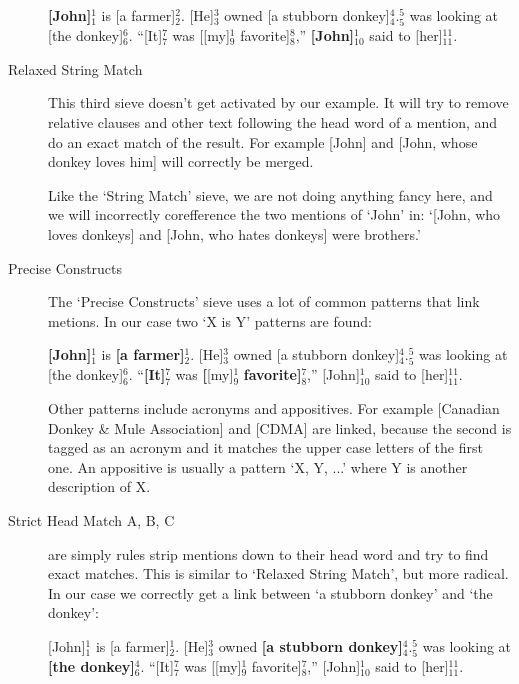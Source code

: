 \documentclass[12pt]{article}
\begin{document}
\begin{description}
\textbf{[John]$_1^1$} is [a farmer]$_2^2$. [He]$_3^3$ owned [a stubborn donkey]$_4^4$.\newline
[A girl]$_5^5$ was looking at [the donkey]$_6^6$.\newline
``[It]$_7^7$ was [[my]$_9^1$ favorite]$_8^8$,'' \textbf{[John]$_{10}^{1}$} said to [her]$_{11}^{11}$.
\item[Relaxed String Match]
This third sieve doesn't get activated by our example. It will try to remove relative clauses and other text following the head word of a mention, and do an exact match of the result. For example [John] and [John, whose donkey loves him] will correctly be merged.

Like the `String Match' sieve, we are not doing anything fancy here, and we will incorrectly corefference the two mentions of `John' in: `[John, who loves donkeys] and [John, who hates donkeys] were brothers.'
\item[Precise Constructs]
The `Precise Constructs' sieve uses a lot of common patterns that link metions. In our case two `X is Y' patterns are found:

\textbf{[John]$_1^1$} is \textbf{[a farmer]$_2^1$}. [He]$_3^3$ owned [a stubborn donkey]$_4^4$.\newline
[A girl]$_5^5$ was looking at [the donkey]$_6^6$.\newline
``\textbf{[It]$_7^7$} was \textbf{[}[my]$_9^1$ \textbf{favorite]$_8^7$},'' [John]$_{10}^1$ said to [her]$_{11}^{11}$.

Other patterns include acronyms and appositives. For example [Canadian Donkey \& Mule Association] and [CDMA] are linked, because the second is tagged as an acronym and it matches the upper case letters of the first one. An appositive is usually a pattern `X, Y, ...' where Y is another description of X.
\item[Strict Head Match A, B, C] are simply rules strip mentions down to their head word and try to find exact matches. This is similar to `Relaxed String Match', but more radical. In our case we correctly get a link between `a stubborn donkey' and `the donkey':

[John]$_1^1$ is [a farmer]$_2^1$. [He]$_3^3$ owned \textbf{[a stubborn donkey]$_4^4$}.\newline
[A girl]$_5^5$ was looking at \textbf{[the donkey]$_6^4$}.\newline
``[It]$_7^7$ was [[my]$_9^1$ favorite]$_8^7$,'' [John]$_{10}^1$ said to [her]$_{11}^{11}$.


\end{description}
\end{document}
